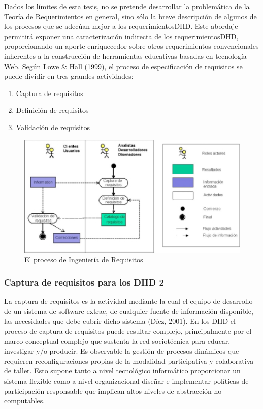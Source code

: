 Dados los límites de esta tesis, no se pretende desarrollar la problemática de la Teoría de
Requerimientos en general, sino sólo la breve descripción de algunos de los
procesos que se adecúan mejor a los requerimientosDHD. Este abordaje
permitirá exponer una caracterización indirecta de los requerimientosDHD,
proporcionando un aporte enriquecedor sobre otros requerimientos convencionales
inherentes a la construcción de herramientas educativas basadas en tecnología
Web. Según Lowe & Hall (1999), el proceso de especificación de requisitos se puede dividir en tres
grandes actividades:

\begin{enumerate}
\item Captura de requisitos
\item Definición de requisitos
\item Validación de requisitos
\end{enumerate}


\begin{figure}
\begin{center}
 \includegraphics[width=4 in,totalheight=3 in] {DHD/requerimientos}
\caption{El proceso de Ingeniería de Requisitos} \label{fig: Requerimientos}
\end{center}
\end{figure}


\subsubsection{Captura de requisitos para los DHD 2}

La captura de requisitos es la actividad mediante la cual el equipo de desarrollo
de un sistema de software extrae, de cualquier fuente de información disponible,
las necesidades que debe cubrir dicho sistema (Díez, 2001). En los DHD el
proceso de captura de requisitos puede resultar complejo, principalmente por el marco conceptual complejo que sustenta la red sociotécnica para educar, investigar y/o producir.
Es observable la gestión de procesos dinámicos que requieren reconfiguraciones propias de la modalidad participativa y colaborativa de taller. Esto supone tanto a nivel tecnológico informático proporcionar un sistema flexible como a nivel organizacional diseñar e implementar políticas de participación responsable que implican altos niveles de abstracción no computables. 


